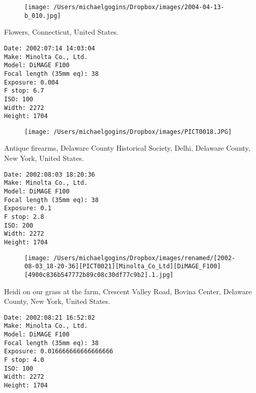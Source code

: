 \documentclass[11pt,letter,DIV=14,paper=landscape]{scrbook}
\begin{document}
\begin{figure}
\texttt{[image: /Users/michaelgogins/Dropbox/images/2004-04-13-b\_010.jpg]}
\end{figure}
    
\clearpage
\noindent Flowers, Connecticut, United States.
\noindent
\begin{lstlisting}
Date: 2002:07:14 14:03:04
Make: Minolta Co., Ltd.
Model: DiMAGE F100
Focal length (35mm eq): 38
Exposure: 0.004
F stop: 6.7
ISO: 100
Width: 2272
Height: 1704
\end{lstlisting}
\clearpage

\begin{figure}
\texttt{[image: /Users/michaelgogins/Dropbox/images/PICT0018.JPG]}
\end{figure}
    
\clearpage
\noindent Antique firearms, Delaware County Historical Society, Delhi, Delaware County, New York, United States.
\noindent
\begin{lstlisting}
Date: 2002:08:03 18:20:36
Make: Minolta Co., Ltd.
Model: DiMAGE F100
Focal length (35mm eq): 38
Exposure: 0.1
F stop: 2.8
ISO: 200
Width: 2272
Height: 1704
\end{lstlisting}
\clearpage

\begin{figure}
\texttt{[image: /Users/michaelgogins/Dropbox/images/renamed/[2002-08-03\_18-20-36][PICT0021][Minolta\_Co\_Ltd][DiMAGE\_F100][4900c836b547772b89c08c30df77c9b2].1.jpg]}
\end{figure}
    
\clearpage
\noindent Heidi on our grass at the farm, Crescent Valley Road, Bovina Center, Delaware County, New York, United States.
\noindent
\begin{lstlisting}
Date: 2002:08:21 16:52:02
Make: Minolta Co., Ltd.
Model: DiMAGE F100
Focal length (35mm eq): 38
Exposure: 0.016666666666666666
F stop: 4.0
ISO: 100
Width: 2272
Height: 1704
\end{lstlisting}
\clearpage
\end{document}
